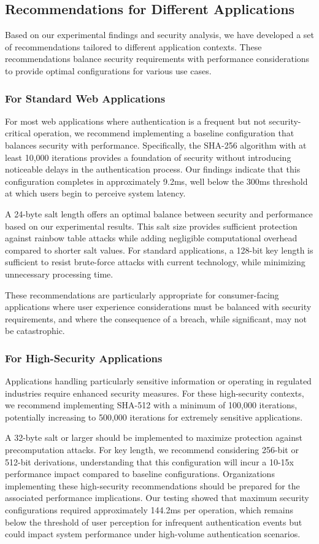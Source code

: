 \documentclass[11pt,a4paper]{article}
\begin{document}
\subsection{Recommendations for Different Applications}
Based on our experimental findings and security analysis, we have developed a set of recommendations tailored to different application contexts. These recommendations balance security requirements with performance considerations to provide optimal configurations for various use cases.
\subsubsection{For Standard Web Applications}
For most web applications where authentication is a frequent but not security-critical operation, we recommend implementing a baseline configuration that balances security with performance. Specifically, the SHA-256 algorithm with at least 10,000 iterations provides a foundation of security without introducing noticeable delays in the authentication process. Our findings indicate that this configuration completes in approximately 9.2ms, well below the 300ms threshold at which users begin to perceive system latency.

A 24-byte salt length offers an optimal balance between security and performance based on our experimental results. This salt size provides sufficient protection against rainbow table attacks while adding negligible computational overhead compared to shorter salt values. For standard applications, a 128-bit key length is sufficient to resist brute-force attacks with current technology, while minimizing unnecessary processing time.

These recommendations are particularly appropriate for consumer-facing applications where user experience considerations must be balanced with security requirements, and where the consequence of a breach, while significant, may not be catastrophic.
\subsubsection{For High-Security Applications}
Applications handling particularly sensitive information or operating in regulated industries require enhanced security measures. For these high-security contexts, we recommend implementing SHA-512 with a minimum of 100,000 iterations, potentially increasing to 500,000 iterations for extremely sensitive applications.

A 32-byte salt or larger should be implemented to maximize protection against precomputation attacks. For key length, we recommend considering 256-bit or 512-bit derivations, understanding that this configuration will incur a 10-15x performance impact compared to baseline configurations.
Organizations implementing these high-security recommendations should be prepared for the associated performance implications. Our testing showed that maximum security configurations required approximately 144.2ms per operation, which remains below the threshold of user perception for infrequent authentication events but could impact system performance under high-volume authentication scenarios.
\end{document}
